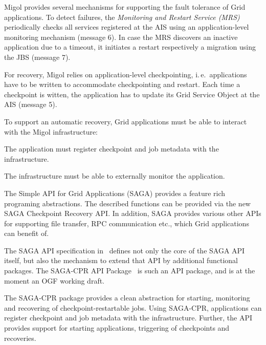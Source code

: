 \documentclass[times, 10pt, twocolumn]{article}
\begin{document}
Migol provides several mechanisms for supporting the fault tolerance of Grid applications.
To detect failures, the \emph{Monitoring and Restart Service (MRS)}
periodically checks all services registered at the AIS using an
application-level monitoring mechanism (message 6). In case the MRS
discovers an inactive application due to a timeout, it initiates a
restart respectively a migration using the JBS (message 7).

For recovery, Migol relies on application-level checkpointing, i.\,e.\
applications have to be written to accommodate checkpointing and
restart.  Each time a checkpoint is witten, the application has to
update its Grid Service Object at the AIS (message 5).

To support an automatic recovery, Grid applications must be able to
interact with the Migol infrastructure:
\begin{compactitem}
    \item The application must register checkpoint and job metadata with the infrastructure.
    \item The infrastructure must be able to externally monitor the application.
\end{compactitem}  
The Simple API for Grid Applications (SAGA) provides a feature rich programing abstractions. The described functions 
can be  provided via the new SAGA Checkpoint Recovery API. In addition, SAGA provides  
various other APIs for supporting file transfer, RPC communication etc., which Grid applications can benefit of.



The SAGA API specification in~\cite{saga_gfd90} defines not only the
core of the SAGA API itself, but also the mechanism to extend that API
by additional functional packages.  The SAGA-CPR API
Package~\cite{saga_cpr_draft} is such an API package, and is at the
moment an OGF working draft.

The SAGA-CPR package provides a clean abstraction for starting,
monitoring and recovering of checkpoint-restartable jobs.
Using SAGA-CPR, applications can register checkpoint and job metadata with the infrastructure. 
Further, the API provides support for starting applications, triggering of checkpoints and recoveries.
\end{document}
